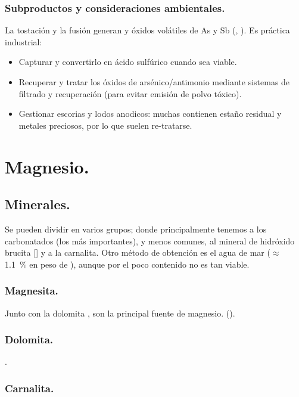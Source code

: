 \documentclass[12pt,a4paper]{article}
\begin{document}
\subsubsection{Subproductos y consideraciones ambientales.}
La tostación y la fusión generan  y óxidos volátiles de As y Sb (, ). Es práctica industrial:
\begin{itemize}
  \item Capturar  y convertirlo en ácido sulfúrico cuando sea viable.
  \item Recuperar y tratar los óxidos de arsénico/antimonio mediante sistemas de filtrado y recuperación (para evitar emisión de polvo tóxico).
  \item Gestionar escorias y lodos anodicos: muchas contienen estaño residual y metales preciosos, por lo que suelen re-tratarse.
\end{itemize}

\section{Magnesio.}

\subsection{Minerales.}

Se pueden dividir en varios grupos; donde principalmente tenemos a los carbonatados (los más importantes), y menos comunes, al mineral de hidróxido brucita [] y a la carnalita. Otro método de obtención es el agua de mar ($\approx$ \SI{1,1}{\percent} en peso de ), aunque por el poco contenido no es tan viable.

\subsubsection{Magnesita.}

Junto con la dolomita , son la principal fuente de magnesio. ().

\subsubsection{Dolomita.}

.

\subsubsection{Carnalita.}
\end{document}
